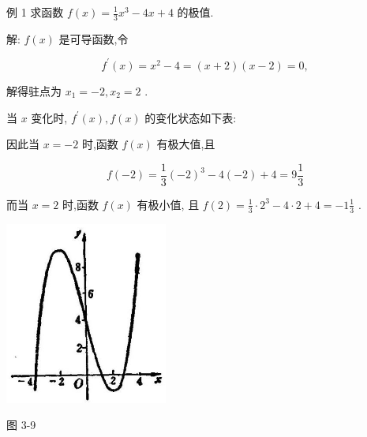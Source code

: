 \documentclass[lang=cn,newtx,12pt,scheme=chinese]{elegantbook}
\begin{document}
例 1 求函数 \(f\left( x\right) = \frac{1}{3}{x}^{3} - {4x} + 4\) 的极值.

解: \(f\left( x\right)\) 是可导函数,令

\[
{f}^{\prime }\left( x\right) = {x}^{2} - 4 = \left( {x + 2}\right) \left( {x - 2}\right) = 0,
\]

解得驻点为 \({x}_{1} = - 2,{x}_{2} = 2\) .

当 \(x\) 变化时, \({f}^{\prime }\left( x\right) ,f\left( x\right)\) 的变化状态如下表:

\begin{center}
\end{center}

因此当 \(x = - 2\) 时,函数 \(f\left( x\right)\) 有极大值,且

\[
f\left( {-2}\right) = \frac{1}{3}{\left( -2\right) }^{3} - 4\left( {-2}\right) + 4 = 9\frac{1}{3}
\]

而当 \(x = 2\) 时,函数 \(f\left( x\right)\) 有极小值, 且 \(f\left( 2\right) = \frac{1}{3} \cdot {2}^{3} - 4 \cdot 2 + 4 = - 1\frac{1}{3}\) .

\begin{center}
\includegraphics[max width=0.4\textwidth]{images/01912c18-5c3f-733d-b775-749ba9897a9d_143_629914.jpg}
\end{center}

图 3-9
\end{document}
